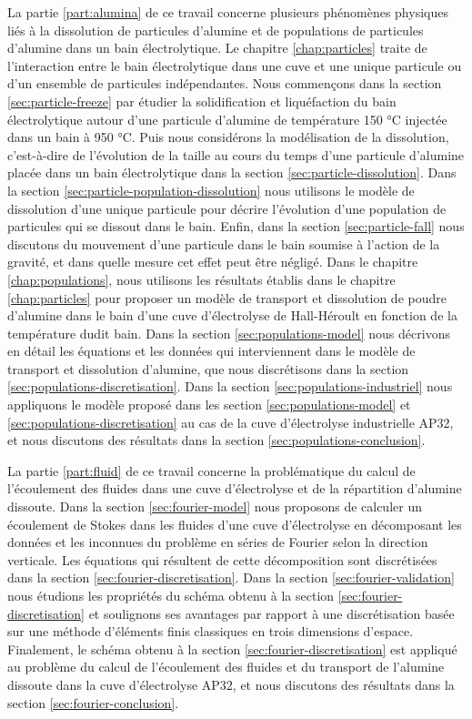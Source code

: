 La partie \ref{part:alumina} de ce travail concerne plusieurs
phénomènes physiques liés à la dissolution de particules d'alumine et
de populations de particules d'alumine dans un bain électrolytique. Le
chapitre \ref{chap:particles} traite de l'interaction entre le bain
électrolytique dans une cuve et une unique particule ou d'un ensemble
de particules indépendantes. Nous commençons dans la section
\ref{sec:particle-freeze} par étudier la solidification et
liquéfaction du bain électrolytique autour d'une particule d'alumine
de température \num{150} \si{\celsius} injectée dans un bain à
\num{950} \si{\celsius}. Puis nous considérons la modélisation de la
dissolution, c'est-à-dire de l'évolution de la taille au cours du
temps d'une particule d'alumine placée dans un bain électrolytique
dans la section \ref{sec:particle-dissolution}. Dans la section
\ref{sec:particle-population-dissolution} nous utilisons le modèle de
dissolution d'une unique particule pour décrire l'évolution d'une
population de particules qui se dissout dans le bain. Enfin, dans la
section \ref{sec:particle-fall} nous discutons du mouvement d'une
particule dans le bain soumise à l'action de la gravité, et dans
quelle mesure cet effet peut être négligé. Dans le chapitre
\ref{chap:populations}, nous utilisons les résultats établis dans le
chapitre \ref{chap:particles} pour proposer un modèle de transport et
dissolution de poudre d'alumine dans le bain d'une cuve d'électrolyse
de Hall-Héroult en fonction de la température dudit bain. Dans la
section \ref{sec:populations-model} nous décrivons en détail les
équations et les données qui interviennent dans le modèle de transport
et dissolution d'alumine, que nous discrétisons dans la section
\ref{sec:populations-discretisation}. Dans la section
\ref{sec:populations-industriel} nous appliquons le modèle proposé
dans les section \ref{sec:populations-model} et
\ref{sec:populations-discretisation} au cas de la cuve d'électrolyse
industrielle AP32, et nous discutons des résultats dans la section
\ref{sec:populations-conclusion}.

La partie \ref{part:fluid} de ce travail concerne la problématique du
calcul de l'écoulement des fluides dans une cuve d'électrolyse et de
la répartition d'alumine dissoute. Dans la section
\ref{sec:fourier-model} nous proposons de calculer un écoulement de
Stokes dans les fluides d'une cuve d'électrolyse en décomposant les
données et les inconnues du problème en séries de Fourier selon la
direction verticale. Les équations qui résultent de cette
décomposition sont discrétisées dans la section
\ref{sec:fourier-discretisation}. Dans la section
\ref{sec:fourier-validation} nous étudions les propriétés du schéma
obtenu à la section \ref{sec:fourier-discretisation} et soulignons ses
avantages par rapport à une discrétisation basée sur une méthode
d'éléments finis classiques en trois dimensions d'espace. Finalement,
le schéma obtenu à la section \ref{sec:fourier-discretisation} est
appliqué au problème du calcul de l'écoulement des fluides et du
transport de l'alumine dissoute dans la cuve d'électrolyse AP32, et
nous discutons des résultats dans la section
\ref{sec:fourier-conclusion}.
